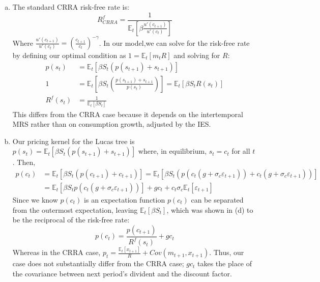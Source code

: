 \documentclass{article}
\newcommand{\Et}[1]{\mathbb{E}_t\left[#1\right]}
\begin{document}
\begin{enumerate}[(a)]
	\item The standard CRRA risk-free rate is:
		\[
			R^f_{CRRA} = \frac{1}{\Et{\beta\frac{u'(c_{t+1})}{u'(c_t)}}}
		\]
		Where ${\frac{u'(c_{t+1})}{u'(c_t)}=\left(\frac{c_{t+1}}{c_{t}}\right)^{-\gamma}}$. In our model,we can solve for the risk-free rate by defining our optimal condition as ${1 = \Et{m_tR}}$ and solving for $R$:
		\begin{align*}
			p(s_t) &= \Et{\beta S_t(p(s_{t+1})+s_{t+1})}	\\
			1 &= \Et{\beta S_t\left(\frac{p(s_{t+1})+s_{t+1}}{p(s_t)}\right)} = \Et{\beta S_tR(s_t)}	\\
			R^f(s_t) &= \frac{1}{\Et{\beta S_t}}
		\end{align*}
		This differs from the CRRA case because it depends on the intertemporal MRS rather than on consumption growth, adjusted by the IES.
	
	\item Our pricing kernel for the Lucas tree is ${p(s_t) = \Et{\beta S_t(p(s_{t+1})+s_{t+1})}}$ where, in equilibrium, ${s_t = c_t}$ for all $t$. Then, 
		\begin{align*}
			p(c_t) 	&= \Et{\beta S_t(p(c_{t+1})+c_{t+1})} = \Et{\beta S_t(p(c_t(g + \sigma_c\varepsilon_{t+1}))+c_t(g + \sigma_c\varepsilon_{t+1}))}	\\
					&= \Et{\beta S_tp(c_t(g + \sigma_c\varepsilon_{t+1}))}+ gc_t + c_t\sigma_c\Et{\varepsilon_{t+1}}
		\end{align*}
		Since we know $p(c_t)$ is an expectation function $p(c_t)$ can be separated from the outermost expectation, leaving $\Et{\beta S_t}$, which was shown in (d) to be the reciprocal of the risk-free rate:
		\[
			p(c_t) 	= \frac{p(c_{t+1})}{R^f(s_t)} + gc_t
		\]
		Whereas in the CRRA case, ${p_t = \frac{\Et{x_{t+1}}}{R} + Cov(m_{t+1},x_{t+1})}$. Thus, our case does not substantially differ from the CRRA case; $gc_t$ takes the place of the covariance between next period's divident and the discount factor.
	
	
\end{enumerate}

\end{document}
